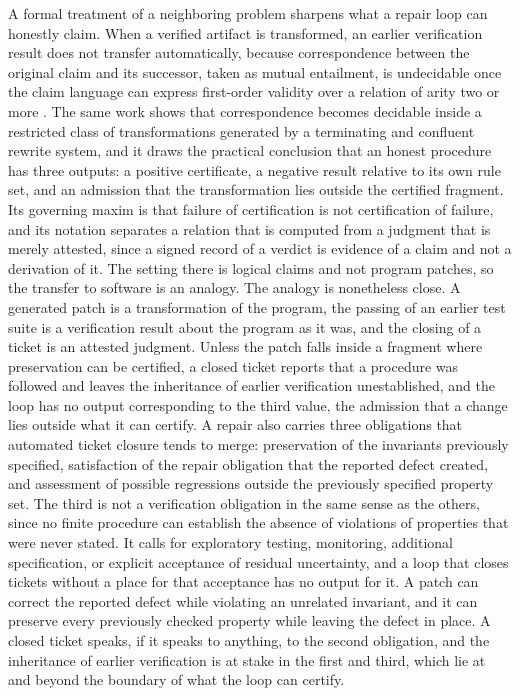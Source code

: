 \documentclass[11pt]{article}
\theoremstyle{remark}
\begin{document}
A formal treatment of a neighboring problem sharpens what a repair loop can honestly claim. When a verified artifact is transformed, an earlier verification result does not transfer automatically, because correspondence between the original claim and its successor, taken as mutual entailment, is undecidable once the claim language can express first-order validity over a relation of arity two or more \cite{flyxion_vit}. The same work shows that correspondence becomes decidable inside a restricted class of transformations generated by a terminating and confluent rewrite system, and it draws the practical conclusion that an honest procedure has three outputs: a positive certificate, a negative result relative to its own rule set, and an admission that the transformation lies outside the certified fragment. Its governing maxim is that failure of certification is not certification of failure, and its notation separates a relation that is computed from a judgment that is merely attested, since a signed record of a verdict is evidence of a claim and not a derivation of it. The setting there is logical claims and not program patches, so the transfer to software is an analogy. The analogy is nonetheless close. A generated patch is a transformation of the program, the passing of an earlier test suite is a verification result about the program as it was, and the closing of a ticket is an attested judgment. Unless the patch falls inside a fragment where preservation can be certified, a closed ticket reports that a procedure was followed and leaves the inheritance of earlier verification unestablished, and the loop has no output corresponding to the third value, the admission that a change lies outside what it can certify. A repair also carries three obligations that automated ticket closure tends to merge: preservation of the invariants previously specified, satisfaction of the repair obligation that the reported defect created, and assessment of possible regressions outside the previously specified property set. The third is not a verification obligation in the same sense as the others, since no finite procedure can establish the absence of violations of properties that were never stated. It calls for exploratory testing, monitoring, additional specification, or explicit acceptance of residual uncertainty, and a loop that closes tickets without a place for that acceptance has no output for it. A patch can correct the reported defect while violating an unrelated invariant, and it can preserve every previously checked property while leaving the defect in place. A closed ticket speaks, if it speaks to anything, to the second obligation, and the inheritance of earlier verification is at stake in the first and third, which lie at and beyond the boundary of what the loop can certify.
\end{document}
